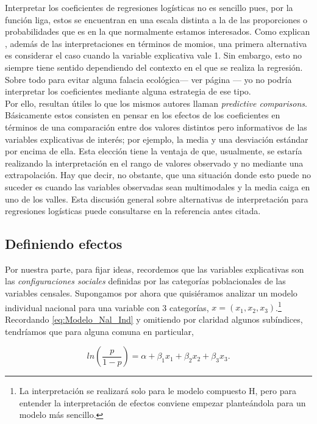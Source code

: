 Interpretar los coeficientes de regresiones logísticas no es sencillo pues, por la función liga, estos se encuentran en una escala distinta a la de las proporciones o probabilidades que es en la que normalmente estamos interesados. Como explican \textcite{GelmanHill06}, además de las interpretaciones en términos de momios, una primera alternativa es considerar el caso cuando la variable explicativa vale 1. Sin embargo, esto no siempre tiene sentido dependiendo del contexto en el que se realiza la regresión. Sobre todo para evitar alguna falacia ecológica--- ver página \pageref{No_Extrapolar}--- yo no podría interpretar los coeficientes mediante alguna estrategia de ese tipo.\\ 

 Por ello, resultan útiles lo que los mismos autores llaman \textit{predictive comparisons}. Básicamente estos consisten en pensar en los efectos de los coeficientes en términos de una comparación entre dos valores distintos pero informativos de las variables explicativas de interés; por ejemplo, la media y una desviación estándar por encima de ella. Esta elección tiene la ventaja de que, usualmente, se estaría realizando la interpretación en el rango de valores observado y no mediante una extrapolación. Hay que decir, no obstante, que una situación donde esto puede no suceder es cuando las variables observadas sean multimodales y la media caiga en uno de los valles. Esta discusión general sobre alternativas de interpretación para regresiones logísticas puede consultarse en la referencia antes citada.\\ 
 
\subsection{Definiendo efectos}

 Por nuestra parte, para fijar ideas, recordemos que las variables explicativas son las \textit{configuraciones sociales} definidas por las categorías poblacionales de las variables censales. Supongamos por ahora que quisiéramos analizar un modelo individual nacional para una variable con 3 categorías, $x = (x_1,x_2,x_3)$.\footnote{La interpretación se realizará solo para le modelo compuesto H, pero para entender la interpretación de efectos conviene empezar planteándola para un modelo más sencillo.} Recordando \eqref{eq:Modelo_Nal_Ind} y omitiendo por claridad algunos subíndices, tendríamos que para alguna comuna en particular,

\begin{equation*}
ln\left(\dfrac{p}{1-p}\right) = \alpha + \beta_1 x_1 + \beta_2 x_2 + \beta_3 x_3.
\end{equation*}

